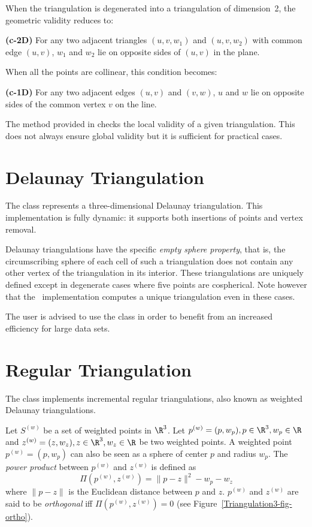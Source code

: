 When the triangulation is degenerated into a triangulation of
dimension~2, the  geometric validity reduces to:

{\bf (c-2D)} For any two adjacent triangles $(u,v,w_1)$ and $(u,v,w_2)$ with
common edge $(u,v)$, $w_1$ and $w_2$ lie on opposite sides of $(u,v)$
in the plane.

When all the points are collinear, this condition becomes:

{\bf (c-1D)} For any two adjacent edges $(u,v)$ and $(v,w)$, $u$ and
$w$ lie on opposite sides of the common vertex $v$ on the line.

The  method provided in  checks
the local validity of a given triangulation. This does not always
ensure global validity \cite{mnssssu-cgpvg-96,dlpt-ccpps-98} but it is 
sufficient for practical cases.


\section{Delaunay Triangulation} 

The class  represents a three-dimensional
Delaunay triangulation.  This implementation is fully dynamic: it
supports both insertions of points and vertex removal.

Delaunay triangulations have the specific \textit{empty sphere property},
that is, the circumscribing sphere of each cell of such a triangulation
does not contain any other vertex of the triangulation in its interior.
These triangulations are uniquely defined except in degenerate cases
where five points are cospherical.  Note however that the \cgal\ implementation
computes a unique triangulation even in these cases.

The user is advised to use the class  in
order to benefit from an increased efficiency for large data sets. 

\section{Regular Triangulation} 
\label{Triangulation3-sec-class-Regulartriangulation}

The class  implements incremental regular
triangulations, also known as weighted Delaunay triangulations.

Let ${S}^{(w)}$ be a set of weighted points in $\R^3$. Let
${p}^{(w)}=(p,w_p), p\in\R^3, w_p\in\R$ and 
${z}^{(w)}=(z,w_z), z\in\R^3, w_z\in\R$ be two weighted points. 
A weighted point
${p}^{(w)}=(p,w_p)$ can also be seen as a sphere of center $p$ and
radius $w_p$. 
The \textit{power product} between ${p}^{(w)}$ and ${z}^{(w)}$ is
defined as 
\[\Pi({p}^{(w)},{z}^{(w)}) = {\|{p-z}\|^2-w_p-w_z}\]
where $\|{p-z}\|$ is the Euclidean distance between $p$ and $z$. 
 ${p}^{(w)}$ and ${z}^{(w)}$
are said to be \textit{orthogonal} iff $\Pi{({p}^{(w)},{z}^{(w)})}
= 0$ (see Figure~\ref{Triangulation3-fig-ortho}).

